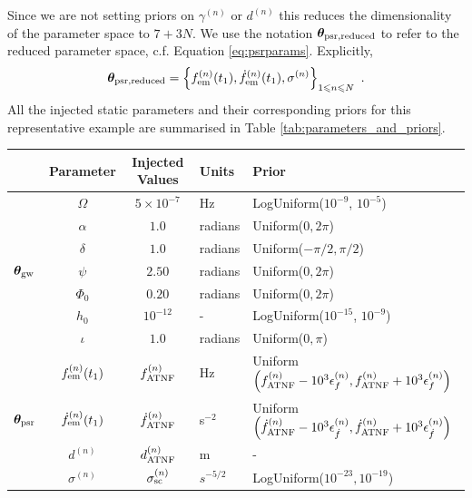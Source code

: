\documentclass[fleqn,usenatbib,useAMS]{mnras}
\begin{document}
Since we are not setting priors on $\gamma^{(n)}$ or $d^{(n)}$ this reduces the dimensionality of the parameter space to $7 + 3N$. We use the notation $\boldsymbol{\theta}_{\rm psr, reduced}$ to refer to the reduced parameter space, c.f. Equation \ref{eq:psrparams}. Explicitly, 
\begin{equation}
	\boldsymbol{\theta}_{\rm psr, reduced} = \left \{ f_{\rm em}^{(n)}(t_1),\dot{f}_{\rm em}^{(n)}(t_1),\sigma^{(n)}\right\}_{1\leq n \leq N} \ .
\end{equation}
All the injected static parameters and their corresponding priors for this representative example are summarised in Table \ref{tab:parameters_and_priors}.
\begin{table}
	\centering
	\begin{tabular}{lccll}
		\toprule
		&Parameter & Injected Values & Units & Prior  \\
		\hline
		\multirow{7}{2mm}{$\boldsymbol{\theta}_{\rm gw}$} & $\Omega$       & $5 \times 10^{-7}$ & Hz & LogUniform($10^{-9}$, $10^{-5}$) \\
	  & $\alpha$          & $1.0$  & radians & Uniform($0, 2 \pi $)\\
	  & $\delta$              & $1.0$  & radians & Uniform($-\pi/2, \pi/2$) \\
	  & $\psi$              & $2.50$ & radians & Uniform($0, 2 \pi $) \\
	  & $\Phi_0$          & $0.20$ & radians & Uniform($0, 2 \pi $) \\
	  & $h_0$            & $10^{-12}$ & - & LogUniform($10^{-15}$, $10^{-9}$) \\
	  & $\iota$             & $1.0$ & radians & Uniform($0, \pi$) \\ 
		\hline
		\multirow{5}{2mm}{$\boldsymbol{\theta}_{\rm psr}$} & $f_{\rm em}^{(n)} (t_1)$       & $f_{\rm ATNF}^{(n)}$ & Hz & Uniform$\left( f_{\rm ATNF}^{(n)} - 10^3 \epsilon^{(n)}_{f}, f_{\rm ATNF}^{(n)} + 10^3 \epsilon^{(n)}_{f} \right)$ \\
		& $\dot{f}_{\rm em}^{(n)} (t_1)$       & $\dot{f}_{\rm ATNF}^{(n)}$ & s$^{-2}$ & Uniform$\left( \dot{f}_{\rm ATNF}^{(n)} - 10^3 \epsilon^{(n)}_{\dot{f}}, \dot{f}_{\rm ATNF}^{(n)} + 10^3 \epsilon^{(n)}_{\dot{f}} \right)$ \\
		&  $d^{(n)}$       &$d_{\rm ATNF}^{(n)}$  & m & - \\
		& $\sigma^{(n)}$              & $\sigma_{\rm sc}^{(n)}$ & $s^{-5/2}$ & LogUniform($10^{-23}, 10^{-19}$) \\

\end{tabular}
\end{table}
\end{document}
